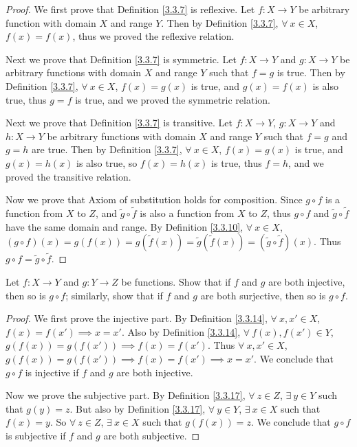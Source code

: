 \begin{proof}
We first prove that Definition \ref{3.3.7} is reflexive.
Let \(f : X \to Y\) be arbitrary function with domain \(X\) and range \(Y\).
Then by Definition \ref{3.3.7}, \(\forall\ x \in X\), \(f(x) = f(x)\), thus we proved the reflexive relation.

Next we prove that Definition \ref{3.3.7} is symmetric.
Let \(f : X \to Y\) and \(g : X \to Y\) be arbitrary functions with domain \(X\) and range \(Y\) such that \(f = g\) is true.
Then by Definition \ref{3.3.7}, \(\forall\ x \in X\), \(f(x) = g(x)\) is true, and \(g(x) = f(x)\) is also true, thus \(g = f\) is true, and we proved the symmetric relation.

Next we prove that Definition \ref{3.3.7} is transitive.
Let \(f : X \to Y\), \(g : X \to Y\) and \(h : X \to Y\) be arbitrary functions with domain \(X\) and range \(Y\) such that \(f = g\) and \(g = h\) are true.
Then by Definition \ref{3.3.7}, \(\forall\ x \in X\), \(f(x) = g(x)\) is true, and \(g(x) = h(x)\) is also true, so \(f(x) = h(x)\) is true, thus \(f = h\), and we proved the transitive relation.

Now we prove that Axiom of substitution holds for composition.
Since \(g \circ f\) is a function from \(X\) to \(Z\), and \(\tilde{g} \circ \tilde{f}\) is also a function from \(X\) to \(Z\), thus \(g \circ f\) and \(\tilde{g} \circ \tilde{f}\) have the same domain and range.
By Definition \ref{3.3.10}, \(\forall\ x \in X\), \((g \circ f)(x) = g(f(x)) = g(\tilde{f}(x)) = \tilde{g}(\tilde{f}(x)) = (\tilde{g} \circ \tilde{f})(x)\).
Thus \(g \circ f = \tilde{g} \circ \tilde{f}\).
\end{proof}

\begin{exercise}\label{ex 3.3.2}
Let \(f : X \to Y\) and \(g : Y \to Z\) be functions.
Show that if \(f\) and \(g\) are both injective, then so is \(g \circ f\);
similarly, show that if \(f\) and \(g\) are both surjective, then so is \(g \circ f\).
\end{exercise}

\begin{proof}
We first prove the injective part.
By Definition \ref{3.3.14}, \(\forall\ x, x' \in X\), \(f(x) = f(x') \implies x = x'\).
Also by Definition \ref{3.3.14}, \(\forall\ f(x), f(x') \in Y\), \(g(f(x)) = g(f(x')) \implies f(x) = f(x')\).
Thus \(\forall\ x, x' \in X\), \(g(f(x)) = g(f(x')) \implies f(x) = f(x')  \implies x = x'\).
We conclude that \(g \circ f\) is injective if \(f\) and \(g\) are both injective.

Now we prove the subjective part.
By Definition \ref{3.3.17}, \(\forall\ z \in Z\), \(\exists\ y \in Y\) such that \(g(y) = z\).
But also by Definition \ref{3.3.17}, \(\forall\ y \in Y\), \(\exists\ x \in X\) such that \(f(x) = y\).
So \(\forall\ z \in Z\), \(\exists\ x \in X\) such that \(g(f(x)) = z\).
We conclude that \(g \circ f\) is subjective if \(f\) and \(g\) are both subjective.
\end{proof}

